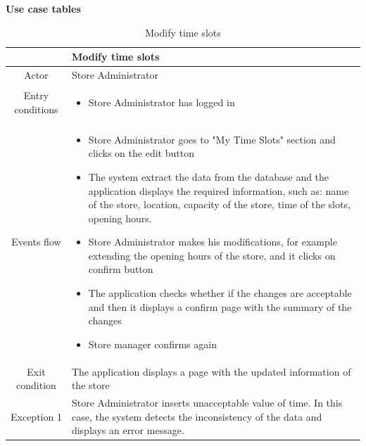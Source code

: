 \documentclass[table, 12pt]{article}
\begin{document}
\begin{minipage}{\textwidth}
    \textbf{Use case tables}\\
    \newpage
    \begin{longtable}{|c| p{10cm}|}
        \caption{Modify time slots}                                                                                                                                              \\
        \hline
                         & Modify time slots                                                                                                                                     \\
        \hline
        Actor            & Store Administrator                                                                                                                                   \\
        \hline
        Entry conditions & \begin{itemize}
            \item Store Administrator has logged in
        \end{itemize}                                                                                                                            \\
        \hline
        Events flow      & \begin{itemize}[nosep,after=\strut]
            \item Store Administrator goes to "My Time Slots" section and clicks on the edit button
            \item The system extract the data from the database and the application displays the required information, such as: name of the store, location, capacity of the store, time of the slots, opening hours.
            \item Store Administrator makes his modifications, for example extending the opening hours of the store, and it clicks on confirm button
            \item The application checks whether if the changes are acceptable and then it displays a confirm page with the summary of the changes
            \item Store manager confirms again
        \end{itemize}                                                                                                                            \\
        \hline
        Exit condition   & The application displays a page with the updated information of the store
        \\
        \hline
        \hline
        Exception 1      & Store Administrator inserts unacceptable value of time. In this case, the system detects the inconsistency of the data and displays an error message. \\
        \hline
    \end{longtable}

\end{minipage}
\end{document}
